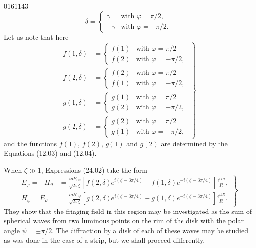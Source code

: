 \begin{scanpage}{0161}{143}
\[
\delta=\begin{cases}\gamma&\text{with }\varphi=\pi/2,\\-\gamma&\text{with }\varphi=-\pi/2.\end{cases}\tag{24.05}
\]
Let us note that here
\[
\left.\begin{aligned}
f(1,\delta)&=\begin{cases}f(1)&\text{with }\varphi=\pi/2\\f(2)&\text{with }\varphi=-\pi/2,\end{cases}\\
f(2,\delta)&=\begin{cases}f(2)&\text{with }\varphi=\pi/2\\f(1)&\text{with }\varphi=-\pi/2,\end{cases}\\
g(1,\delta)&=\begin{cases}g(1)&\text{with }\varphi=\pi/2\\g(2)&\text{with }\varphi=-\pi/2,\end{cases}\\
g(2,\delta)&=\begin{cases}g(2)&\text{with }\varphi=\pi/2\\g(1)&\text{with }\varphi=-\pi/2,\end{cases}
\end{aligned}\right\}\tag{24.06}
\]
and the functions $f(1)$, $f(2)$, $g(1)$ and $g(2)$ are determined by the Equations (12.03) and (12.04).

When $\zeta\gg1$, Expressions (24.02) take the form
\[
\left.\begin{aligned}E_\varphi=-H_\vartheta&=\frac{iaE_{0\varphi}}{\sqrt{2\pi\zeta}}[f(2,\delta)e^{i(\zeta-3\pi/4)}-f(1,\delta)e^{-i(\zeta-3\pi/4)}]\frac{e^{ikR}}R,\\
H_\varphi=E_\vartheta&=\frac{iaH_{0\varphi}}{\sqrt{2\pi\zeta}}[g(2,\delta)e^{i(\zeta-3\pi/4)}-g(1,\delta)e^{-i(\zeta-3\pi/4)}]\frac{e^{ikR}}R.
\end{aligned}\right\}\tag{24.07}
\]
They show that the fringing field in this region may be investigated as the sum of spherical waves from two luminous points on the rim of the disk with the polar angle $\psi=\pm\pi/2$. The diffraction by a disk of each of these waves may be studied as was done in the case of a strip, but we shall proceed differently.
\end{scanpage}
